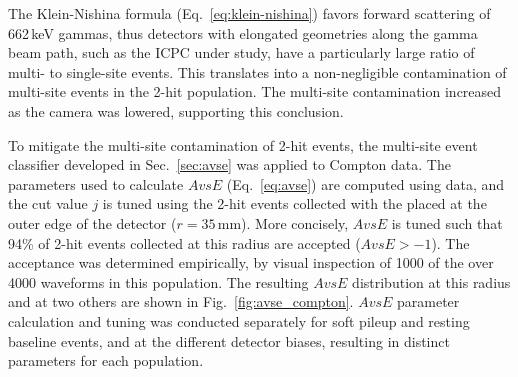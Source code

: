 The Klein-Nishina formula (Eq.~\ref{eq:klein-nishina}) favors forward scattering of 662\,keV gammas, thus detectors with elongated geometries along the gamma beam path, such as the ICPC under study, have a particularly large ratio of multi- to single-site events. This translates into a non-negligible contamination of multi-site events in the 2-hit population. The multi-site contamination increased as the camera was lowered, supporting this conclusion. 

To mitigate the multi-site contamination of 2-hit events, the multi-site event classifier developed in Sec.~\ref{sec:avse} was applied to Compton data. The parameters used to calculate $AvsE$ (Eq.~\ref{eq:avse}) are computed using \ThS{} data, and the cut value $j$ is tuned using the 2-hit events collected with the \CsS{} placed at the outer edge of the detector ($r = 35$\,mm). More concisely, $AvsE$ is tuned such that 94\% of 2-hit events collected at this radius are accepted ($AvsE > -1$). The acceptance was determined empirically, by visual inspection of 1000 of the over 4000 waveforms in this population. The resulting $AvsE$ distribution at this radius and at two others are shown in Fig.~\ref{fig:avse_compton}. $AvsE$ parameter calculation and tuning was conducted separately for soft pileup and resting baseline events, and at the different detector biases, resulting in distinct parameters for each population.


